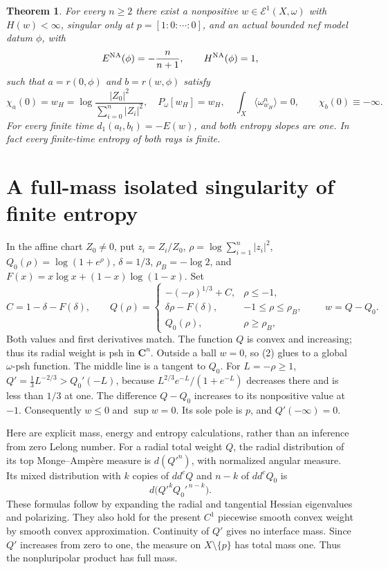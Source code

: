 \documentclass[10pt]{article}
\newtheorem{theorem}{Theorem}
\newcommand{\ddc}{dd^c}
\begin{document}
\begin{theorem}\label{main}
For every $n\geq2$ there exist a nonpositive
$w\in\mathcal E^1(X,\omega)$ with $H(w)<\infty$, singular only at
$p=[1:0:\cdots:0]$, and an actual bounded nef model datum $\phi$, with
\[
 E^{\rm NA}(\phi)=-\frac n{n+1},\qquad H^{\rm NA}(\phi)=1,
\]
such that $a=r(0,\phi)$ and $b=r(w,\phi)$ satisfy
\[
 \chi_a(0)=w_H=\log\frac{|Z_0|^2}{\sum_{i=0}^n|Z_i|^2},
 \quad P_\omega[w_H]=w_H,\quad
 \int_X\langle\omega_{w_H}^n\rangle=0,\qquad
 \chi_b(0)\equiv-\infty.                              \tag{1}
\]
For every finite time $d_1(a_t,b_t)=-E(w)$, and both entropy slopes
are one. In fact every finite-time entropy of both rays is finite.
\end{theorem}

\section{A full-mass isolated singularity of finite entropy}
In the affine chart $Z_0\ne0$, put $z_i=Z_i/Z_0$,
$\rho=\log\sum_{i=1}^n|z_i|^2$, $Q_0(\rho)=\log(1+e^\rho)$,
$\delta=1/3$, $\rho_B=-\log2$, and
$F(x)=x\log x+(1-x)\log(1-x)$. Set
\[
 C=1-\delta-F(\delta),\qquad
 Q(\rho)=
 \begin{cases}
 -(-\rho)^{1/3}+C,&\rho\leq-1,\\
 \delta\rho-F(\delta),&-1\leq\rho\leq\rho_B,\\
 Q_0(\rho),&\rho\geq\rho_B,
 \end{cases}
 \qquad w=Q-Q_0.                                      \tag{2}
\]
Both values and first derivatives match. The function $Q$ is convex
and increasing; thus its radial weight is psh in $\mathbf C^n$.
Outside a ball $w=0$, so (2) glues to a global $\omega$-psh function.
The middle line is a tangent to $Q_0$. For $L=-\rho\geq1$,
$Q'=\tfrac13L^{-2/3}>Q_0'(-L)$, because
$L^{2/3}e^{-L}/(1+e^{-L})$ decreases there and is less than $1/3$
at one. The difference $Q-Q_0$ increases to its nonpositive value
at $-1$. Consequently $w\leq0$ and $\sup w=0$.
Its sole pole is $p$, and $Q'(-\infty)=0$.

Here are explicit mass, energy and entropy calculations, rather than
an inference from zero Lelong number. For a radial total weight $Q$,
the radial distribution of its top Monge--Amp\`ere measure is
$d(Q'^n)$, with normalized angular measure. Its mixed distribution
with $k$ copies of $\ddc Q$ and $n-k$ of $\ddc Q_0$ is
\[
                    d\bigl(Q'^k Q_0'^{\,n-k}\bigr).     \tag{3}
\]
These formulas follow by expanding the radial and tangential Hessian
eigenvalues and polarizing. They also hold for the present $C^1$
piecewise smooth convex weight by smooth convex approximation.
Continuity of $Q'$ gives no interface mass. Since $Q'$ increases from
zero to one, the measure on $X\setminus\{p\}$ has total mass one.
Thus the nonpluripolar product has full mass.
\end{document}
